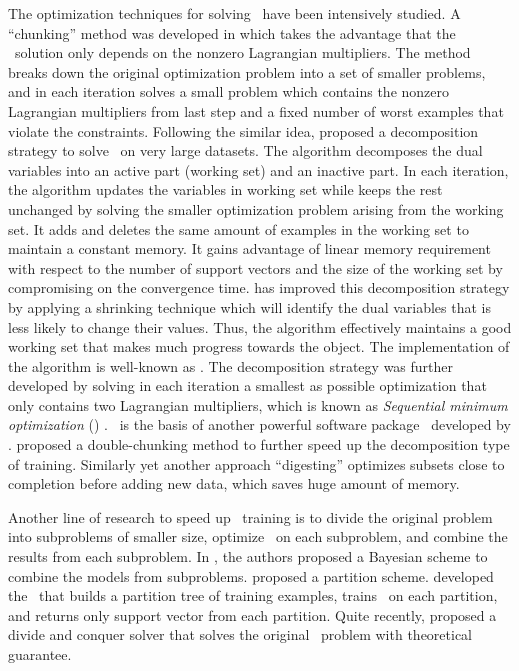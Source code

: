 {\iffalse
The optimization techniques for solving \svm\ have been intensively studied.
A ``chunking'' method was developed in \citep{Vapnik82estimation} which takes the advantage that the \svm\ solution only depends on the nonzero Lagrangian multipliers.
The method breaks down the original optimization problem into a set of smaller problems, and in each iteration solves a small problem which contains the nonzero Lagrangian multipliers from last step and a fixed number of worst examples that violate the constraints.
Following the similar idea, \citet{Osuna97an} proposed a decomposition strategy to solve \svm\ on very large datasets.
The algorithm decomposes the dual variables into an active part (working set) and an inactive part.
In each iteration, the algorithm updates the variables in working set while keeps the rest unchanged by solving the smaller optimization problem arising from the working set.
It adds and deletes the same amount of examples in the working set to maintain a constant memory.
It gains advantage of linear memory requirement with respect to the number of support vectors and the size of the working set by compromising on the convergence time.
\citet{Joachims98making} has improved this decomposition strategy by applying a shrinking technique which will identify the dual variables that is less likely to change their values.
Thus, the algorithm effectively maintains a good working set that makes much progress towards the object.
The implementation of the algorithm is well-known as \svmlight.
The decomposition strategy was further developed by solving in each iteration a smallest as possible optimization that only contains two Lagrangian multipliers, which is known as \textit{Sequential minimum optimization} (\smo) \citep{Platt98sequential,Platt99fast}.
\smo\ is the basis of another powerful software package \libsvm\ developed by \citet{Chang11libsvm}.
\citet{Perezcruz04double} proposed a double-chunking method to further speed up the decomposition type of training. 
Similarly yet another approach ``digesting'' \citep{Decoste02support} optimizes subsets close to completion before adding new data, which saves huge amount of memory.

Another line of research to speed up \svm\ training is to divide the original problem into subproblems of smaller size, optimize \svm\ on each subproblem, and combine the results from each subproblem.
In \citep{Tresp00a,Schwaighofer01the}, the authors proposed a Bayesian scheme to combine the models from subproblems.
\citet{Collobert02a} proposed a partition scheme.
\citet{Graf05parallel} developed the \svmcascade\ that builds a partition tree of training examples, trains \svm\ on each partition, and returns only support vector from each partition.
Quite recently, \citet{Hsieh14a} proposed a divide and conquer solver that solves the original \svm\ problem with theoretical guarantee.

}

